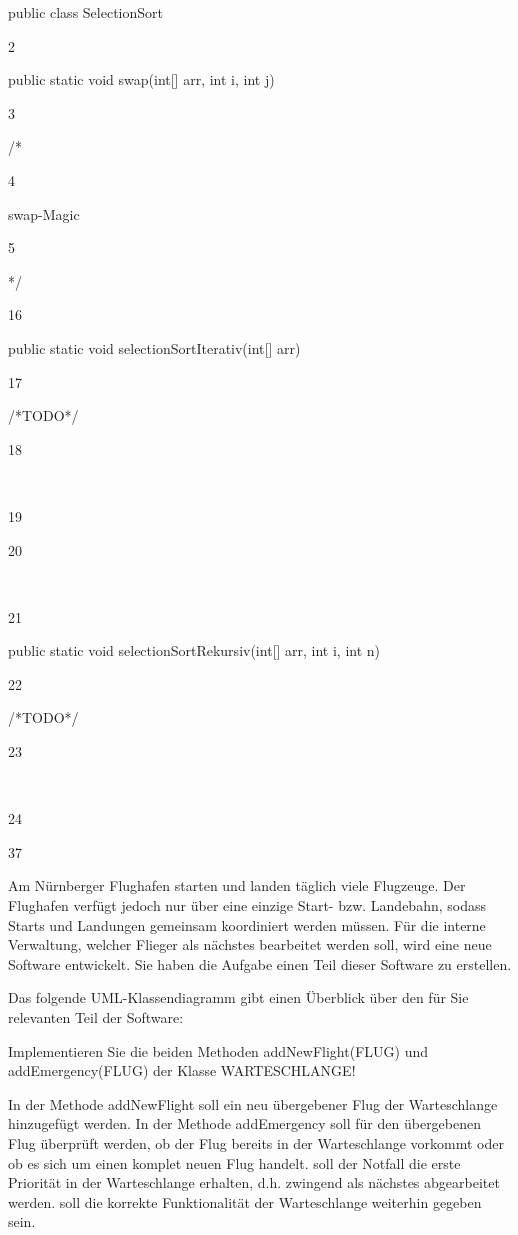 \documentclass{lehramt-informatik}
\begin{document}
public class SelectionSort{

2

    public static void swap(int[] arr, int i, int j){

3

        /*

4

         swap-Magic

5

        */

16

    public static void selectionSortIterativ(int[] arr){

17

        /*TODO*/

18

​

19

    }

20

​

21

    public static void selectionSortRekursiv(int[] arr, int i, int n){

22

        /*TODO*/

23

​

24

    }

37

}

Am Nürnberger Flughafen starten und landen täglich viele Flugzeuge. Der Flughafen verfügt jedoch nur über eine einzige Start- bzw. Landebahn, sodass Starts und Landungen gemeinsam koordiniert werden müssen. Für die interne Verwaltung, welcher Flieger als nächstes bearbeitet werden soll, wird eine neue Software entwickelt. Sie haben die Aufgabe einen Teil dieser Software zu erstellen.

Das folgende UML-Klassendiagramm gibt einen Überblick über den für Sie relevanten Teil der Software:

Implementieren Sie die beiden Methoden addNewFlight(FLUG) und addEmergency(FLUG) der Klasse WARTESCHLANGE!

    In der Methode addNewFlight
        soll ein neu übergebener Flug der Warteschlange hinzugefügt werden.
    In der Methode addEmergency
        soll für den übergebenen Flug überprüft werden, ob der Flug bereits in der Warteschlange vorkommt oder ob es sich um einen komplet neuen Flug handelt.
        soll der Notfall die erste Priorität in der Warteschlange erhalten, d.h. zwingend als nächstes abgearbeitet werden.
        soll die korrekte Funktionalität der Warteschlange weiterhin gegeben sein.

}
\end{document}
